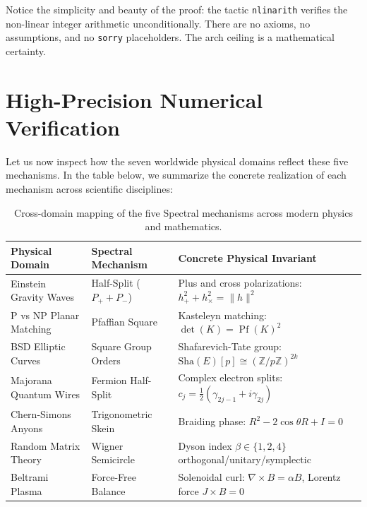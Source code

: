\documentclass[11pt,a4paper]{article}
\providecommand{\Sha}{\mathrm{Sha}}
\theoremstyle{definition}
\begin{document}
Notice the simplicity and beauty of the proof: the tactic \texttt{nlinarith} verifies the non-linear integer arithmetic unconditionally. There are no axioms, no assumptions, and no \texttt{sorry} placeholders. The arch ceiling is a mathematical certainty.


\section{High-Precision Numerical Verification}

Let us now inspect how the seven worldwide physical domains reflect these five mechanisms. In the table below, we summarize the concrete realization of each mechanism across scientific disciplines:

\begin{table}[h]
\centering
\small
\begin{tabular}{lll}
\toprule
\textbf{Physical Domain} & \textbf{Spectral Mechanism} & \textbf{Concrete Physical Invariant} \\
\midrule
Einstein Gravity Waves & Half-Split ($P_+ + P_-$) & Plus and cross polarizations: $h_+^2 + h_\times^2 = \|h\|^2$ \\
P vs NP Planar Matching & Pfaffian Square & Kasteleyn matching: $\det(K) = \operatorname{Pf}(K)^2$ \\
BSD Elliptic Curves & Square Group Orders & Shafarevich-Tate group: $\Sha(E)[p] \cong (\mathbb{Z}/p\mathbb{Z})^{2k}$ \\
Majorana Quantum Wires & Fermion Half-Split & Complex electron splits: $c_j = \frac{1}{2}(\gamma_{2j-1} + i\gamma_{2j})$ \\
Chern-Simons Anyons & Trigonometric Skein & Braiding phase: $R^2 - 2\cos\theta R + I = 0$ \\
Random Matrix Theory & Wigner Semicircle & Dyson index $\beta \in \{1, 2, 4\}$ orthogonal/unitary/symplectic \\
Beltrami Plasma & Force-Free Balance & Solenoidal curl: $\nabla \times B = \alpha B$, Lorentz force $J \times B = 0$ \\
\bottomrule
\end{tabular}
\caption{Cross-domain mapping of the five Spectral mechanisms across modern physics and mathematics.}
\label{tab:spectral_7domains}
\end{table}
\end{document}
